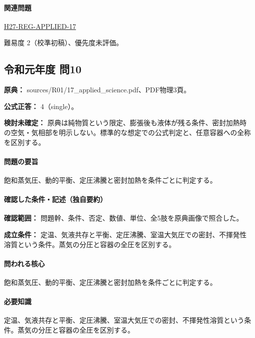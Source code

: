 \paragraph{関連問題} \hyperref[q:h27-reg-applied-17]{H27-REG-APPLIED-17}

\par 難易度 2（校準初稿）、優先度未評価。

\subsection{令和元年度 問10}
\label{q:r01-reg-applied-10}

\noindent\textbf{原典：} sources/R01/17\_applied\_science.pdf、PDF物理3頁。

\textbf{公式正答：} 4（single）。

\par\textbf{検討未確定：} 原典は純物質という限定、膨張後も液体が残る条件、密封加熱時の空気・気相部を明示しない。標準的な想定での公式判定と、任意容器への全称を区別する。

\paragraph{問題の要旨} 飽和蒸気圧、動的平衡、定圧沸騰と密封加熱を条件ごとに判定する。

\paragraph{確認した条件・記述（独自要約）}\mbox{}\par

\noindent\textbf{確認範囲：} 問題幹、条件、否定、数値、単位、全5肢を原典画像で照合した。\par

\noindent\textbf{成立条件：} 定温、気液共存と平衡、定圧沸騰、室温大気圧での密封、不揮発性溶質という条件。蒸気の分圧と容器の全圧を区別する。\par

\paragraph{問われる核心} 飽和蒸気圧、動的平衡、定圧沸騰と密封加熱を条件ごとに判定する。

\paragraph{必要知識} 定温、気液共存と平衡、定圧沸騰、室温大気圧での密封、不揮発性溶質という条件。蒸気の分圧と容器の全圧を区別する。

